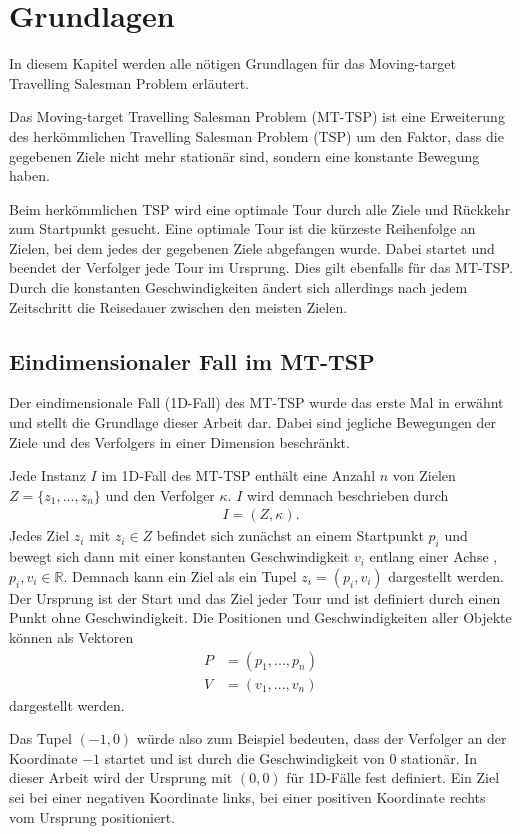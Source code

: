 \documentclass[german,version-2019-11]{uzl-thesis}
\begin{document}
\chapter{Grundlagen}
\label{chapter-use}
In diesem Kapitel werden alle nötigen Grundlagen für das Moving-target Travelling Salesman Problem erläutert. 
\begin{definition}
Das Moving-target Travelling Salesman Problem (MT-TSP) ist eine Erweiterung des herkömmlichen Travelling Salesman Problem (TSP) um den Faktor, dass die gegebenen Ziele nicht mehr stationär sind, sondern eine konstante Bewegung haben.
\end{definition}\noindent
Beim herkömmlichen TSP wird eine optimale Tour durch alle Ziele und Rückkehr zum Startpunkt gesucht. Eine optimale Tour ist die kürzeste Reihenfolge an Zielen, bei dem jedes der gegebenen Ziele abgefangen wurde. Dabei startet und beendet der Verfolger jede Tour im Ursprung. Dies gilt ebenfalls für das MT-TSP. Durch die konstanten Geschwindigkeiten ändert sich allerdings nach jedem Zeitschritt die Reisedauer zwischen den meisten Zielen.

\section{Eindimensionaler Fall im MT-TSP}
Der eindimensionale Fall (1D-Fall) des MT-TSP wurde das erste Mal in \cite{helvig} erwähnt und stellt die Grundlage dieser Arbeit dar. Dabei sind jegliche Bewegungen der Ziele und des Verfolgers in einer Dimension 
beschränkt.
\begin{definition} 
\label{def:Instanz}
Jede Instanz $I$ im 1D-Fall des MT-TSP enthält eine Anzahl $n$ von Zielen $Z = \{z_1,...,z_n\}$ und den Verfolger $\kappa$. $I$ wird demnach beschrieben durch
\begin{align*}
I = (Z, \kappa).
\end{align*}
Jedes Ziel $z_i$ mit $z_i\in Z$ befindet sich zunächst an einem Startpunkt $p_i$ und bewegt sich dann mit einer konstanten Geschwindigkeit $v_i$ entlang einer Achse , $p_i, v_i \in\mathbb{R}$. Demnach kann ein Ziel als ein Tupel $z_i = (p_i, v_i)$ dargestellt werden. Der Ursprung ist der Start und das Ziel jeder Tour und ist definiert durch einen Punkt ohne Geschwindigkeit. Die Positionen und Geschwindigkeiten aller Objekte können als Vektoren
\begin{align*}
P &= (p_1, ..., p_n)\\
V &= (v_1, ..., v_n)
\end{align*}\newpage\noindent
dargestellt werden.
\end{definition}\noindent
Das Tupel $(-1,0)$ würde also zum Beispiel bedeuten, dass der Verfolger an der Koordinate $-1$ startet und ist durch die Geschwindigkeit von $0$ stationär. In dieser Arbeit wird der Ursprung mit $(0,0)$ für 1D-Fälle fest definiert. Ein Ziel sei bei einer negativen Koordinate links, bei einer positiven Koordinate rechts vom Ursprung positioniert.
\end{document}
